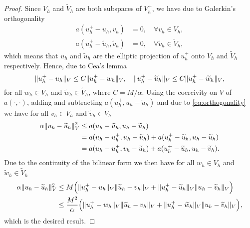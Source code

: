 \begin{proof} Since $V_h$ and $\widetilde V_h$ are both subspaces of $V_h^+$, we have due to Galerkin's orthogonality
	\begin{equation}\label{eq:orthogonality}
	\begin{aligned}
		a(u_h^+ - u_h, v_h) &=0, \quad \forall v_h \in V_h, \\
		a(u_h^+ - \widetilde u_h, \widetilde v_h) &= 0, \quad \forall \widetilde v_h \in \widetilde V_h,
	\end{aligned}
	\end{equation}
	which means that $u_h$ and $\widetilde u_h$ are the elliptic projection of $u_h^+$ onto $V_h$ and $\widetilde V_h$ respectively. Hence, due to Cea's lemma
	\begin{equation}\label{eq:SumSpaceOptimality}
		\lVert u_h^+ - u_h\rVert_V \leq C\lVert u_h^+ - w_h\rVert_V, \quad 	\lVert u_h^+ - \widetilde u_h\rVert_V \leq C\lVert u_h^+ - \widetilde w_h\rVert_V,
	\end{equation}
	for all $w_h \in V_h$ and $\widetilde w_h \in \widetilde V_h$, where $C = M / \alpha$. Using the coercivity on $V$ of $a(\cdot, \cdot)$, adding and subtracting $a(u_h^+, u_h - \widetilde u_h)$ and due to \eqref{eq:orthogonality} we have for all $v_h \in V_h$ and $\widetilde v_h \in \widetilde V_h$
	\begin{equation}
	\begin{aligned}
		\alpha \lVert u_h - \widetilde u_h\rVert_V^2 &\leq a(u_h - \widetilde u_h, u_h - \widetilde u_h)\\
		&= a(u_h - u_h^+, u_h - \widetilde u_h) + a(u_h^+ - \widetilde u_h, u_h - \widetilde u_h)\\
		&= a(u_h - u_h^+, v_h - \widetilde u_h) + a(u_h^+ - \widetilde u_h, u_h - \widetilde v_h).
	\end{aligned}
	\end{equation}
	Due to the continuity of the bilinear form we then have for all $w_h \in V_h$ and $\widetilde w_h \in \widetilde V_h$ 
	\begin{equation}
	\begin{aligned}
		\alpha \lVert u_h - \widetilde u_h\rVert_V^2 &\leq M \Big(\lVert u_h^+ - u_h\rVert_V\lVert\widetilde u_h - v_h\rVert_V + \lVert u_h^+ - \widetilde u_h\rVert_V\lVert u_h - \widetilde v_h\rVert_V\Big)\\
		&\leq \frac{M^2}{\alpha} \Big(\lVert u_h^+ - w_h\rVert_V\lVert\widetilde u_h - v_h\rVert_V + \lVert u_h^+ - \widetilde w_h\rVert_V\lVert u_h - \widetilde v_h\rVert_V\Big),
	\end{aligned}
	\end{equation}
	which is the desired result.
\end{proof}

